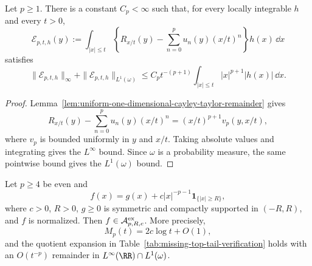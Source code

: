 \begin{lemma}
\label{lem:borderline-local-quotient-remainder-estimate}
Let \(p\ge1\).  There is a constant \(C_p<\infty\) such that, for every
locally integrable \(h\) and every \(t>0\),
\[
\mathcal E_{p,t,h}(y):=
  \int_{|x|\le t}
  \left\{R_{x/t}(y)-\sum_{n=0}^{p}u_n(y)(x/t)^n\right\}h(x)\,\dd x
\]
satisfies
\begin{equation}\label{eq:borderline-local-quotient-remainder-estimate}
\|\mathcal E_{p,t,h}\|_\infty+
\|\mathcal E_{p,t,h}\|_{L^1(\omega)}
\le
C_p t^{-(p+1)}\int_{|x|\le t}|x|^{p+1}|h(x)|\,\dd x .
\end{equation}
\end{lemma}

\begin{proof}
Lemma~\ref{lem:uniform-one-dimensional-cayley-taylor-remainder} gives
\[
R_{x/t}(y)-\sum_{n=0}^{p}u_n(y)(x/t)^n
=(x/t)^{p+1}v_p(y,x/t),
\]
where \(v_p\) is bounded uniformly in \(y\) and \(x/t\).  Taking absolute
values and integrating gives the \(L^\infty\) bound.  Since \(\omega\) is a
probability measure, the same pointwise bound gives the \(L^1(\omega)\) bound.
\end{proof}

\begin{lemma}
\label{lem:exact-power-borderline-tail-controls}
Let \(p\ge4\) be even and
\[
f(x)=g(x)+c|x|^{-p-1}\mathbf1_{\{|x|\ge R\}},
\]
where \(c>0\), \(R>0\), \(g\ge0\) is symmetric and compactly supported in
\((-R,R)\), and \(f\) is normalized.  Then \(f\in\mathcal A_{p,R,c}^{\rm ex}\).
More precisely,
\[
M_p(t)=2c\log t+O(1),
\]
and the quotient expansion in Table~\ref{tab:missing-top-tail-verification}
holds with an \(O(t^{-p})\) remainder in
\(L^\infty(\RR)\cap L^1(\omega)\).
\end{lemma}

